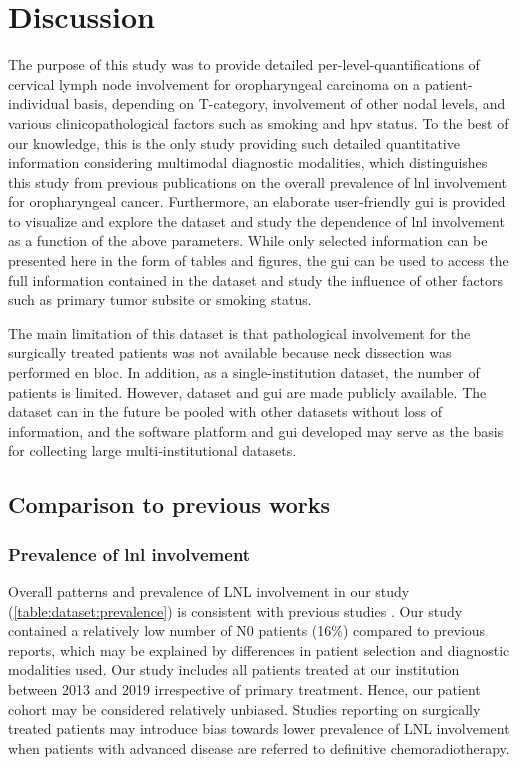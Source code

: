 \documentclass[\relativeRoot/main.tex]{subfiles}
\begin{document}
\section{Discussion}
\label{sec:dataset:discussion}

The purpose of this study was to provide detailed per-level-quantifications of cervical lymph node involvement for oropharyngeal carcinoma on a patient-individual basis, depending on T-category, involvement of other nodal levels, and various clinicopathological factors such as smoking and \gls{hpv} status. To the best of our knowledge, this is the only study providing such detailed quantitative information considering multimodal diagnostic modalities, which distinguishes this study from previous publications on the overall prevalence of \gls{lnl} involvement for oropharyngeal cancer. Furthermore, an elaborate user-friendly \gls{gui} is provided to visualize and explore the dataset and study the dependence of \gls{lnl} involvement as a function of the above parameters. While only selected information can be presented here in the form of tables and figures, the \gls{gui} can be used to access the full information contained in the dataset and study the influence of other factors such as primary tumor subsite or smoking status.

The main limitation of this dataset is that pathological involvement for the surgically treated patients was not available because neck dissection was performed en bloc. In addition, as a single-institution dataset, the number of patients is limited. However, dataset and \gls{gui} are made publicly available. The dataset can in the future be pooled with other datasets without loss of information, and the software platform and \gls{gui} developed may serve as the basis for collecting large multi-institutional datasets.

\subsection*{Comparison to previous works}

\subsubsection*{Prevalence of \gls{lnl} involvement}

Overall patterns and prevalence of LNL involvement in our study (\cref{table:dataset:prevalence}) is consistent with previous studies \cite{candela_patterns_1990,gregoire_selection_2000,iyizoba-ebozue_retropharyngeal_2020}. Our study contained a relatively low number of N0 patients (16\%) compared to previous reports, which may be explained by differences in patient selection and diagnostic modalities used. Our study includes all patients treated at our institution between 2013 and 2019 irrespective of primary treatment. Hence, our patient cohort may be considered relatively unbiased. Studies reporting on surgically treated patients may introduce bias towards lower prevalence of LNL involvement when patients with advanced disease are referred to definitive chemoradiotherapy.
\end{document}
